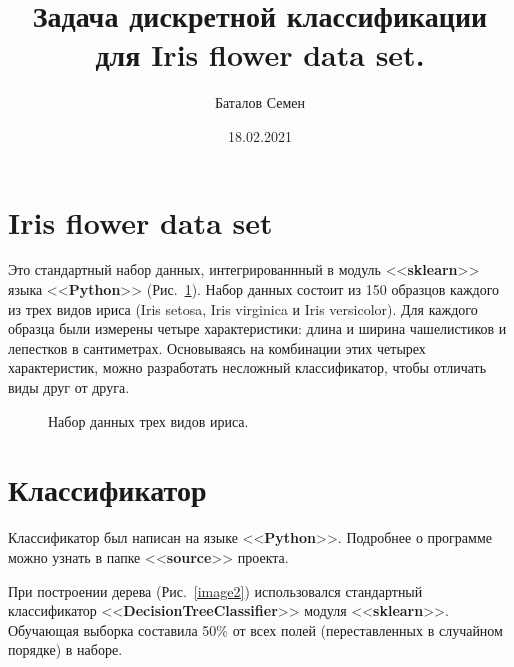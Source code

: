 \documentclass[12pt, a4paper]{article}
\title{Задача дискретной классификации для Iris flower data set.}
\author{Баталов Семен}
\date{18.02.2021}
\begin{document}
    
    \sloppy
    
    \maketitle
    
    \section{Iris flower data set}
    
    Это стандартный набор данных, интегрированнный в модуль <<\textbf{sklearn}>> 
    языка <<\textbf{Python}>> (Рис.~\ref{image1}). Набор данных состоит из 150 
    образцов каждого из трех видов ириса (Iris setosa, Iris virginica и Iris 
    versicolor). Для каждого образца были измерены четыре характеристики: длина и 
    ширина чашелистиков и лепестков в сантиметрах. Основываясь на комбинации этих 
    четырех характеристик, можно разработать несложный классификатор, чтобы отличать 
    виды друг от друга.
    
    \begin{figure} [h]
        \caption{Набор данных трех видов ириса.}
        \label{image1}
    \end{figure}
    
    \section{Классификатор}
    
    Классификатор был написан на языке <<\textbf{Python}>>. Подробнее о программе можно узнать в папке <<\textbf{source}>> проекта.
    
    При построении дерева (Рис.~\ref{image2}) использовался стандартный 
    классификатор <<\textbf{DecisionTreeClassifier}>> модуля <<\textbf{sklearn}>>. 
    Обучающая выборка составила 50\% от всех полей (переставленных в случайном 
    порядке) в наборе.
    
\end{document}
